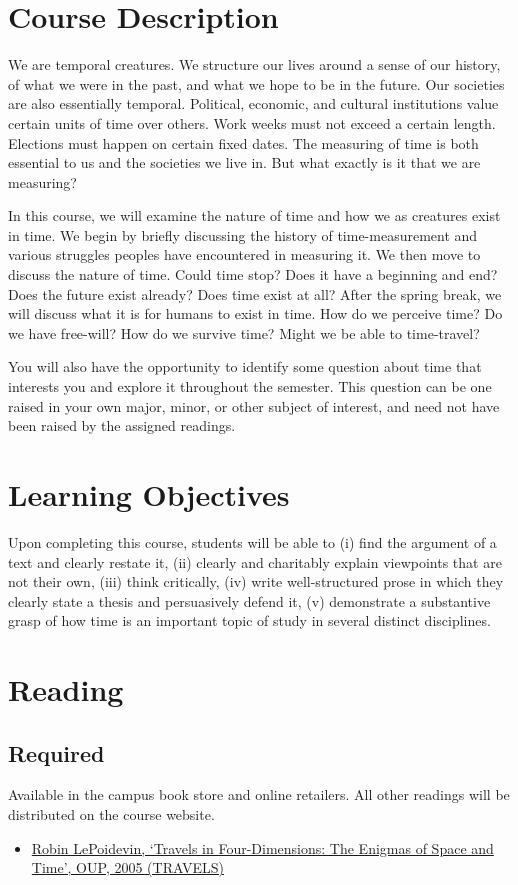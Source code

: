 \documentclass[article,oneside]{memoir}
\begin{document}
\section{Course Description}

We are temporal creatures. We structure our lives around a sense of our history, of what we were in the past, and what we hope to be in the future. Our societies are also essentially temporal. Political, economic, and cultural institutions value certain units of time over others. Work weeks must not exceed a certain length. Elections must happen on certain fixed dates. The measuring of time is both essential to us and the societies we live in. But what exactly is it that we are measuring?

  In this course, we will examine the nature of time and how we as creatures exist in time. We begin by briefly discussing the history of time-measurement and various struggles peoples have encountered in measuring it. We then move to discuss the nature of time. Could time stop? Does it have a beginning and end? Does the future exist already? Does time exist at all?  After the spring break, we will discuss what it is for humans to exist in time. How do we perceive time? Do we have free-will? How do we survive time? Might we be able to time-travel? 
  
You will also have the opportunity to identify some question about time that interests you and explore it throughout the semester. This question can be one raised in your own major, minor, or other subject of interest, and need not have been raised by the assigned readings.   



\section{Learning Objectives}

Upon completing this course, students will be able to (i) find the argument of a text and clearly restate it, (ii) clearly and charitably explain viewpoints that are not their own, (iii) think critically, (iv) write well-structured prose in which they clearly state a thesis and persuasively defend it, (v) demonstrate a substantive grasp of how time is an  important topic of study in several distinct disciplines. 


\section{Reading}
\subsection{Required}
Available in the campus book store and online retailers. All other readings will be distributed on the course website. 
\begin{itemize}
\item \href{http://www.amazon.com/Travels-Four-Dimensions-Enigmas-Space/dp/0198752555/ref=sr_1_1?ie=UTF8&qid=1452098846&sr=8-1&keywords=robin+le+poidevin+enigmas}{Robin LePoidevin, `Travels in Four-Dimensions: The Enigmas of Space and Time', OUP, 2005 (TRAVELS)}
\end{itemize}
\end{document}
